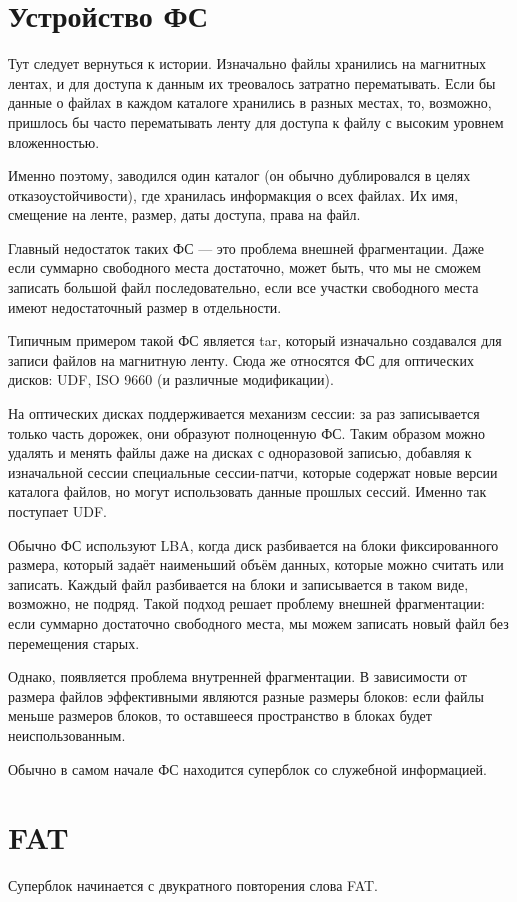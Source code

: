 \documentclass[main]{subfiles}
\begin{document}
\section{Устройство ФС}
Тут следует вернуться к истории. Изначально файлы хранились на магнитных
лентах, и для доступа к данным их треовалось затратно перематывать.
Если бы данные о файлах в каждом каталоге хранились в разных местах, то,
возможно, пришлось бы часто перематывать ленту для доступа к файлу с высоким
уровнем вложенностью.

Именно поэтому, заводился один каталог (он обычно дублировался в целях
отказоустойчивости), где хранилась информакция о всех файлах.
Их имя, смещение на ленте, размер, даты доступа, права на файл.

Главный недостаток таких ФС --- это проблема внешней фрагментации.
Даже если суммарно свободного места достаточно, может быть, что мы не
сможем записать большой файл последовательно, если все участки свободного места
имеют недостаточный размер в отдельности.

Типичным примером такой ФС является tar, который изначально создавался
для записи файлов на магнитную ленту. Сюда же относятся ФС для оптических
дисков: UDF, ISO 9660 (и различные модификации).

На оптических дисках поддерживается механизм сессии: за раз записывается только
часть дорожек, они образуют полноценную ФС. Таким образом можно удалять и менять
файлы даже на дисках с одноразовой записью, добавляя к изначальной сессии
специальные сессии-патчи, которые содержат новые версии каталога файлов, но
могут использовать данные прошлых сессий. Именно так поступает UDF.

Обычно ФС используют LBA, когда диск разбивается на блоки фиксированного размера,
который задаёт наименьший объём данных, которые можно считать или записать.
Каждый файл разбивается на блоки и записывается в таком виде, возможно,
не подряд. Такой подход решает проблему внешней фрагментации: если суммарно
достаточно свободного места, мы можем записать новый файл без перемещения
старых.

Однако, появляется проблема внутренней фрагментации. В зависимости от размера
файлов эффективными являются разные размеры блоков: если файлы меньше размеров
блоков, то оставшееся пространство в блоках будет неиспользованным.

Обычно в самом начале ФС находится суперблок со служебной информацией.

\section{FAT}
Суперблок начинается с двукратного повторения слова FAT.
\end{document}
